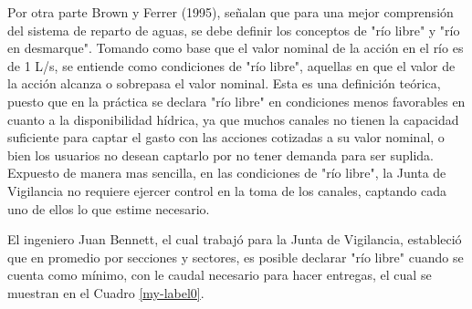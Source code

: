 \documentclass[11pt,]{article}
\begin{document}
	 Por otra parte Brown y Ferrer (1995), señalan que para una mejor comprensión del sistema de reparto de aguas, se debe definir los conceptos de "río libre" y "río en desmarque". Tomando como base que el valor nominal de la acción en el río es de 1 L/s, se entiende como condiciones de "río libre", aquellas en que el valor de la acción alcanza o sobrepasa el valor nominal. Esta es una definición teórica, puesto que en la práctica se declara "río libre" en condiciones menos favorables en cuanto a la disponibilidad hídrica, ya que muchos canales no tienen la capacidad suficiente para captar el gasto con las acciones cotizadas a su valor nominal, o bien los usuarios no desean captarlo por no tener demanda para ser suplida. Expuesto de manera mas sencilla, en las condiciones de "río libre", la Junta de Vigilancia no requiere ejercer control en la toma de los canales, captando cada uno de ellos lo que estime necesario.\bigskip

El ingeniero Juan Bennett, el cual trabajó para la Junta de Vigilancia,  estableció que en promedio por secciones y sectores, es posible declarar "río libre" cuando se cuenta como mínimo, con le caudal necesario para hacer entregas, el cual se muestran en el Cuadro \ref{my-label0}.

\begin{table}[H]
\centering
\caption{Desmarque mínimo para considerar "río Libre". (DGA, 1995)}
\label{my-label0}
\end{table}
	 
\end{document}
